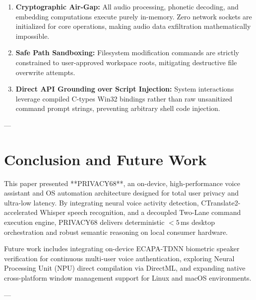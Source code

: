 \documentclass[conference]{IEEEtran}
\begin{document}
\begin{enumerate}
    \item \textbf{Cryptographic Air-Gap:} All audio processing, phonetic decoding, and embedding computations execute purely in-memory. Zero network sockets are initialized for core operations, making audio data exfiltration mathematically impossible.
    \item \textbf{Safe Path Sandboxing:} Filesystem modification commands are strictly constrained to user-approved workspace roots, mitigating destructive file overwrite attempts.
    \item \textbf{Direct API Grounding over Script Injection:} System interactions leverage compiled C-types Win32 bindings rather than raw unsanitized command prompt strings, preventing arbitrary shell code injection.
\end{enumerate}

---

\section{Conclusion and Future Work}
This paper presented **PRIVACY68**, an on-device, high-performance voice assistant and OS automation architecture designed for total user privacy and ultra-low latency. By integrating neural voice activity detection, CTranslate2-accelerated Whisper speech recognition, and a decoupled Two-Lane command execution engine, PRIVACY68 delivers deterministic $<5$\,ms desktop orchestration and robust semantic reasoning on local consumer hardware.

Future work includes integrating on-device ECAPA-TDNN biometric speaker verification \cite{desplanques2020ecapa} for continuous multi-user voice authentication, exploring Neural Processing Unit (NPU) direct compilation via DirectML, and expanding native cross-platform window management support for Linux and macOS environments.

---
\end{document}
